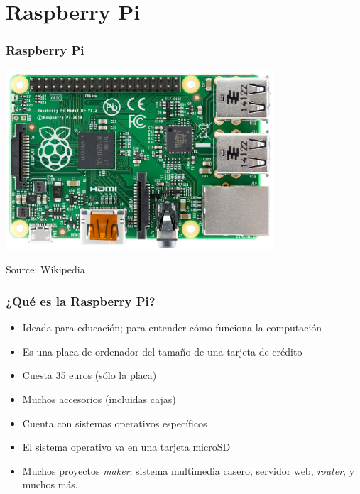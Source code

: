 
\section{Raspberry Pi}

\begin{frame}
\frametitle{Raspberry Pi}

\begin{center}
  \includegraphics[width=10cm]{figs/raspberry.jpg}
\end{center}


\begin{flushright}
{\tiny
Source: Wikipedia
}
\end{flushright}

\end{frame}


\begin{frame}
\frametitle{¿Qué es la Raspberry Pi?}

\begin{itemize}
   \item Ideada para educación; para entender cómo funciona la computación
   \item Es una placa de ordenador del tamaño de una tarjeta de crédito
   \item Cuesta 35 euros (sólo la placa)
   \item Muchos accesorios (incluidas cajas)
   \item Cuenta con sistemas operativos específicos
   \item El sistema operativo va en una tarjeta microSD
   \item Muchos proyectos \emph{maker}: sistema multimedia casero, servidor web,
\emph{router}, y muchos más.
\end{itemize}

\end{frame}


